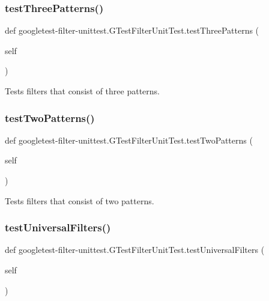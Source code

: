 \subsubsection{\texorpdfstring{testThreePatterns()}{testThreePatterns()}}
{\footnotesize\ttfamily def googletest-\/filter-\/unittest.\+G\+Test\+Filter\+Unit\+Test.\+test\+Three\+Patterns (\begin{DoxyParamCaption}\item[{}]{self }\end{DoxyParamCaption})}

\begin{DoxyVerb}Tests filters that consist of three patterns.\end{DoxyVerb}
 \mbox{\label{classgoogletest-filter-unittest_1_1_g_test_filter_unit_test_a7b2e7e1424bd6be9cbd15a401017c442}} 
\subsubsection{\texorpdfstring{testTwoPatterns()}{testTwoPatterns()}}
{\footnotesize\ttfamily def googletest-\/filter-\/unittest.\+G\+Test\+Filter\+Unit\+Test.\+test\+Two\+Patterns (\begin{DoxyParamCaption}\item[{}]{self }\end{DoxyParamCaption})}

\begin{DoxyVerb}Tests filters that consist of two patterns.\end{DoxyVerb}
 \mbox{\label{classgoogletest-filter-unittest_1_1_g_test_filter_unit_test_a6b3267ec5eb1a4d335d2f969d28329dd}} 
\subsubsection{\texorpdfstring{testUniversalFilters()}{testUniversalFilters()}}
{\footnotesize\ttfamily def googletest-\/filter-\/unittest.\+G\+Test\+Filter\+Unit\+Test.\+test\+Universal\+Filters (\begin{DoxyParamCaption}\item[{}]{self }\end{DoxyParamCaption})}

